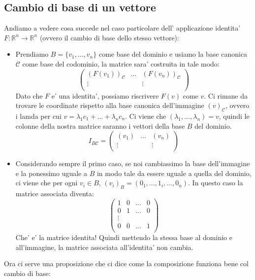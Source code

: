 \documentclass{report}
\begin{document}
\subsection{Cambio di base di un vettore}
Andiamo a vedere cosa succede nel caso particolare dell' applicazione identita' $ F:\mathbb{R}^n\to\mathbb{R}^n $ (ovvero il cambio di base dello stesso vettore):
\begin{itemize}
\item Prendiamo $ B = \{v_1,...,v_n\} $ come base del dominio e usiamo la base canonica $ \mathcal{C} $ come base del codominio, la matrice sara' costruita in tale modo:
  \[
  \begin{pmatrix}
    (F(v_1))_{\mathcal{C}} & ... & (F(v_n))_{\mathcal{C}}\\
  \vdots &  & \vdots\\
  \end{pmatrix}
  \]
    Dato che $ F $ e' una identita', possiamo riscrivere $ F(v) $ come $ v $. Ci rimane da trovare le coordinate rispetto alla base canonica dell'immagine $ (v)_{\mathcal{C}} $, ovvero i lamda per cui $ v = \lambda_1 c_1 + ... + \lambda_n c_n $. Ci viene che $ (\lambda_1,...,\lambda_n) = v $, quindi le colonne della nostra matrice saranno i vettori della base $ B $ del dominio.
    \[
    I_{B\mathcal{C}} = \begin{pmatrix}
      (v_1) & ... & (v_n)\\
    \vdots &  & \vdots\\
    \end{pmatrix}
    \]
  \item Considerando sempre il primo caso, se noi cambiassimo la base dell'immagine e la ponessimo uguale a $ B $ in modo tale da essere uguale a quella del dominio, ci viene che per ogni $ v_i \in B $, $ (v_i)_B = (0_1, ..., 1_i, ..., 0_n) $. In questo caso la matrice associata diventa:
    \[
    \begin{pmatrix}
    1 & 0 & ... & 0\\
    0 & 1 & ... & 0\\
    \vdots &  &  & \\
    0 & 0 & ... & 1\\
    \end{pmatrix}
    \]
  Che' e' la matrice identita! Quindi mettendo la stessa base al dominio e all'immagine, la matrice associata all'identita' non cambia.
\end{itemize}
Ora ci serve una proposizione che ci dice come la composizione funziona bene col cambio di base:
\end{document}
